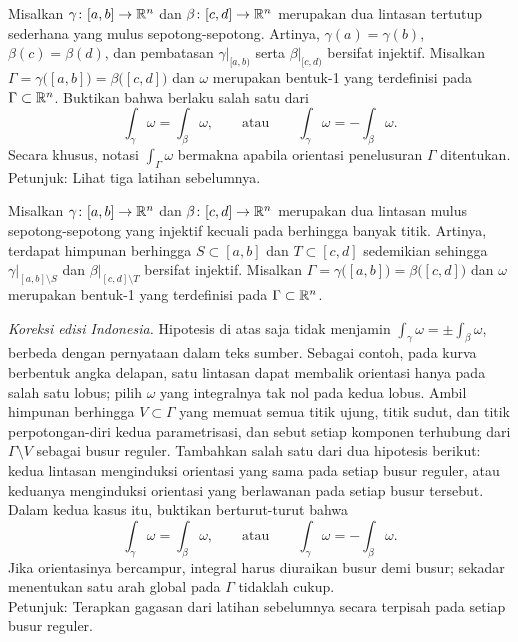 \begin{exercise} \label{mv:exercise:closedcurveintegral}
\pagebreak[1]
Misalkan $\gamma \colon [a,b] \to {\mathbb{R}}^n$ dan
$\beta \colon [c,d] \to {\mathbb{R}}^n$ merupakan dua lintasan tertutup sederhana yang
mulus sepotong-sepotong. Artinya, $\gamma(a)=\gamma(b)$,
$\beta(c)=\beta(d)$, dan pembatasan $\gamma|_{[a,b)}$ serta
$\beta|_{[c,d)}$ bersifat injektif.
Misalkan $\Gamma = \gamma\bigl([a,b]\bigr) = \beta\bigl([c,d]\bigr)$ dan
$\omega$ merupakan bentuk-1 yang terdefinisi pada $\Gamma \subset {\mathbb{R}}^n$.
Buktikan bahwa berlaku salah satu dari
\begin{equation*}
\int_\gamma \omega = 
\int_\beta \omega,
\qquad \text{atau} \qquad 
\int_\gamma \omega = 
- \int_\beta \omega.
\end{equation*}
Secara khusus, notasi $\int_{\Gamma} \omega$ bermakna apabila orientasi
penelusuran $\Gamma$ ditentukan.
Petunjuk: Lihat tiga latihan sebelumnya.
\end{exercise}

\begin{exercise} \label{mv:exercise:curveintegral}
Misalkan $\gamma \colon [a,b] \to {\mathbb{R}}^n$ dan
$\beta \colon [c,d] \to {\mathbb{R}}^n$ merupakan dua lintasan mulus sepotong-sepotong
yang injektif kecuali pada berhingga banyak titik. Artinya, terdapat himpunan
berhingga $S \subset [a,b]$ dan $T \subset [c,d]$ sedemikian sehingga
$\gamma|_{[a,b]\setminus S}$ dan $\beta|_{[c,d]\setminus T}$ bersifat
injektif. Misalkan
$\Gamma = \gamma\bigl([a,b]\bigr) = \beta\bigl([c,d]\bigr)$ dan $\omega$
merupakan bentuk-1 yang terdefinisi pada $\Gamma \subset {\mathbb{R}}^n$.

\emph{Koreksi edisi Indonesia.}
Hipotesis di atas saja tidak menjamin
$\int_\gamma\omega=\pm\int_\beta\omega$, berbeda dengan pernyataan dalam teks
sumber. Sebagai contoh, pada kurva berbentuk angka delapan, satu lintasan dapat
membalik orientasi hanya pada salah satu lobus; pilih $\omega$ yang integralnya
tak nol pada kedua lobus. Ambil himpunan berhingga $V\subset\Gamma$ yang memuat
semua titik ujung, titik sudut, dan titik perpotongan-diri kedua parametrisasi,
dan sebut setiap komponen terhubung dari $\Gamma\setminus V$ sebagai busur
reguler. Tambahkan salah satu dari dua hipotesis berikut: kedua lintasan
menginduksi orientasi yang sama pada setiap busur reguler, atau keduanya
menginduksi orientasi yang berlawanan pada setiap busur tersebut. Dalam kedua
kasus itu, buktikan berturut-turut bahwa
\begin{equation*}
\int_\gamma \omega = 
\int_\beta \omega,
\qquad \text{atau} \qquad 
\int_\gamma \omega = 
- \int_\beta \omega.
\end{equation*}
Jika orientasinya bercampur, integral harus diuraikan busur demi busur; sekadar
menentukan satu arah global pada $\Gamma$ tidaklah cukup.
\\
Petunjuk: Terapkan gagasan dari latihan sebelumnya secara terpisah pada setiap
busur reguler.
\end{exercise}

